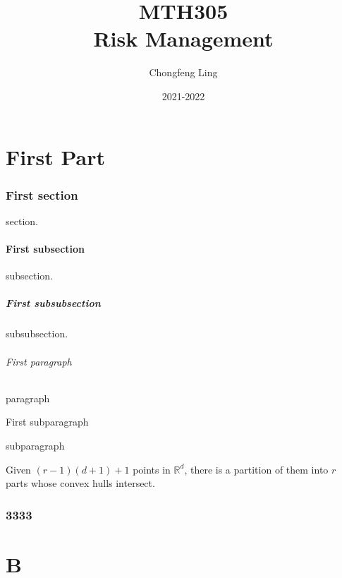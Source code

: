 \documentclass[12pt, a4paper, oneside]{article}
\title{{\Huge{\textbf{MTH305}}}\\\Huge{\textbf{Risk Management}}}
\author{Chongfeng Ling}
\date{2021-2022}
\newcommand{\rr}{\mathbb{R}}
\begin{document}
\null  %
\nointerlineskip  %
\vfill
\let\snewpage \newpage
\let\newpage \relax
\maketitle
\setcounter{page}{0}
\thispagestyle{empty}
\let \newpage \snewpage
\vfill
\break %

\newpage
{}
\setcounter{page}{1}
\tableofcontents


\renewcommand\thepart{\Alph{part}}

\newpage
\setcounter{page}{1}

\part{First Part}

\section{First section}
section.

\subsection{First subsection}
subsection.

\subsubsection{First subsubsection}
subsubsection.

\paragraph{First paragraph}
paragraph

\subparagraph{First subparagraph}
subparagraph

\begin{theorem}
    Given $(r-1)(d+1)+1$ points in $\rr^d$, there is a partition of them into $r$ parts whose convex hulls intersect.
\end{theorem}

\section{3333}


\newpage
\part{B}
\end{document}
